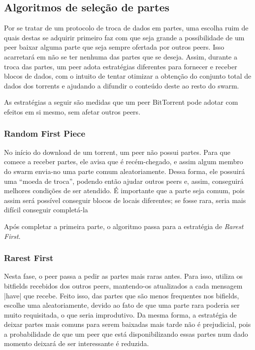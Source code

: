 
\newpage
\subsection*{Algoritmos de seleção de partes}

Por se tratar de um protocolo de troca de dados em partes, uma escolha ruim de quais
destas se adquirir primeiro faz com que seja grande a possibilidade de um \gls*{peer}
baixar alguma parte que seja sempre ofertada por outros \glspl*{peer}. Isso acarretará
em não se ter nenhuma das partes que se deseja. Assim, durante a troca das partes, um
\gls*{peer} adota estratégias diferentes para fornecer e receber blocos de dados, com o
intuito de tentar otimizar a obtenção do conjunto total de dados dos \glspl*{torrent} e
ajudando a difundir o conteúdo deste ao resto do \gls*{swarm}.

As estratégias a seguir são medidas que um \gls*{peer} BitTorrent pode adotar com
efeitos em si mesmo, sem afetar outros \glspl*{peer}.

\subsubsection*{Random First Piece}

No início do download de um \gls*{torrent}, um \gls*{peer} não possui partes. Para que
comece a receber partes, ele avisa que é recém-chegado, e assim algum membro do
\gls*{swarm} envia-no uma parte comum aleatoriamente. Dessa forma, ele possuirá uma
``moeda de troca'', podendo então ajudar outros \glspl*{peer} e, assim, conseguirá
melhores condições de ser atendido. É importante que a parte seja comum, pois assim
será possível conseguir blocos de locais diferentes; se fosse rara, seria mais difícil
conseguir completá-la

Após completar a primeira parte, o algoritmo passa para a estratégia de \emph{Rarest
First}.

\subsubsection*{Rarest First}

Nesta fase, o \gls*{peer} passa a pedir as partes mais raras antes. Para isso, utiliza
os bitfields recebidos dos outros \glspl*{peer}, mantendo-os atualizados a cada mensagem
\bverb|have| que recebe. Feito isso, das partes que são menos frequentes nos bifields,
escolhe uma aleatoriamente, devido ao fato de que uma parte rara poderia ser muito
requisitada, o que seria improdutivo. Da mesma forma, a estratégia de deixar partes mais
comuns para serem baixadas mais tarde não é prejudicial, pois a probabilidade de que um
\gls*{peer} que está disponibilizando essas partes num dado momento deixará de ser
interessante é reduzida.

